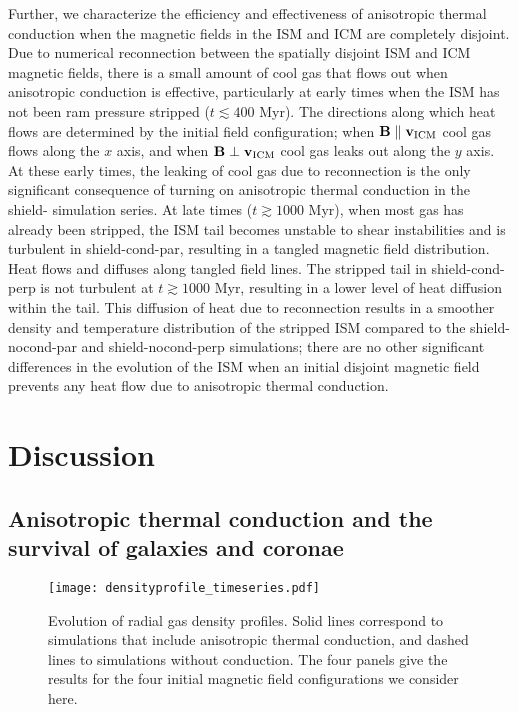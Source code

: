 \documentclass[twocolumn]{aastex6}
\begin{document}
Further, we characterize the efficiency and effectiveness of anisotropic thermal conduction when the magnetic fields in the ISM and ICM are completely disjoint. Due to numerical reconnection between the spatially disjoint ISM and ICM magnetic fields, there is a small amount of cool gas that flows out when anisotropic conduction is effective, particularly at early times when the ISM has not been ram pressure stripped ($t \lesssim 400$ Myr). The directions along which heat flows are determined by the initial field configuration; when $\mathbf{B} \parallel \mathbf{v_{\rm ICM}}$ cool gas flows along the $x$ axis, and when $\mathbf{B} \perp \mathbf{v_{\rm ICM}}$ cool gas leaks out along the $y$ axis. At these early times, the leaking of cool gas due to reconnection is the only significant consequence of turning on anisotropic thermal conduction in the shield- simulation series. At late times ($t \gtrsim 1000$ Myr), when most gas has already been stripped, the ISM tail becomes unstable to shear instabilities and is turbulent in shield-cond-par, resulting in a tangled magnetic field distribution. Heat flows and diffuses along tangled field lines. The stripped tail in shield-cond-perp is not turbulent at $t \gtrsim 1000$ Myr, resulting in a lower level of heat diffusion within the tail. This diffusion of heat due to reconnection results in a smoother density and temperature distribution of the stripped ISM compared to the shield-nocond-par and shield-nocond-perp simulations; there are no other significant differences in the evolution of the ISM when an initial disjoint magnetic field prevents any heat flow due to anisotropic thermal conduction. 
 
\section{Discussion}
\label{sec:discussion}
\subsection{Anisotropic thermal conduction and the survival of galaxies and coronae}

\begin{figure*}[!htbp]
  \begin{center}    
    {\texttt{[image: densityprofile\_timeseries.pdf]}}
     \caption{Evolution of radial gas density profiles. Solid lines correspond to simulations that include anisotropic thermal conduction, and dashed lines to simulations without conduction. 
     The four panels give the results for the four initial magnetic field configurations we consider here.
     \label{fig:densprof_all}}
  \end{center}  
\end{figure*}
\end{document}
